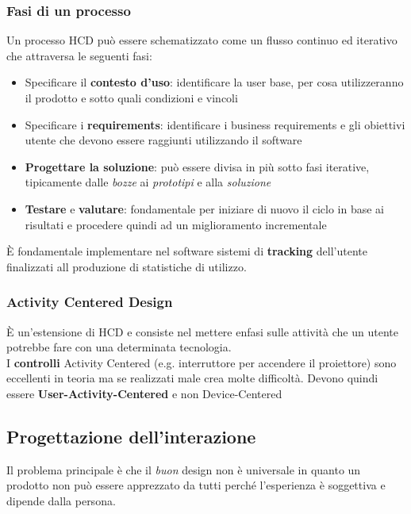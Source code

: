 \subsubsection{Fasi di un processo}
Un processo HCD può essere schematizzato come un flusso continuo ed iterativo che attraversa le seguenti fasi:
\begin{itemize}
	\item Specificare il \textbf{contesto d'uso}: identificare la user base, per cosa utilizzeranno il prodotto e sotto quali condizioni e vincoli
	\item Specificare i \textbf{requirements}: identificare i business requirements e gli obiettivi utente che devono essere raggiunti utilizzando il software
	\item \textbf{Progettare la soluzione}: può essere divisa in più sotto fasi iterative, tipicamente dalle \textit{bozze} ai \textit{prototipi} e alla \textit{soluzione}
	\item \textbf{Testare} e \textbf{valutare}: fondamentale per iniziare di nuovo il ciclo in base ai risultati e procedere quindi ad un miglioramento incrementale
\end{itemize}

\begin{note}
	È fondamentale implementare nel software sistemi di \textbf{tracking} dell'utente finalizzati all produzione di statistiche di utilizzo.
\end{note}

\subsubsection{Activity Centered Design}
È un'estensione di HCD e consiste nel mettere enfasi sulle attività che un utente potrebbe fare con una determinata tecnologia.\\
I \textbf{controlli} Activity Centered (e.g. interruttore per accendere il proiettore) sono eccellenti in teoria ma se realizzati male crea molte difficoltà. Devono quindi essere \textbf{User-Activity-Centered} e non Device-Centered

\subsection{Progettazione dell'interazione}
Il problema principale è che il \textit{buon} design non è universale in quanto un prodotto non può essere apprezzato da tutti perché l'esperienza è soggettiva e dipende dalla persona.\\

